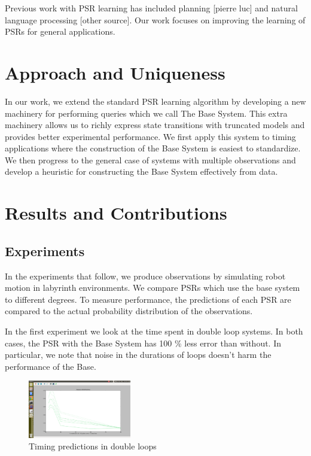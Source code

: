 \documentclass{acm_proc_article-sp}
\begin{document}
Previous work with PSR learning has included planning [pierre luc] and natural language processing [other source]. Our work focuses on improving the learning of PSRs for general applications.

\section{Approach and Uniqueness} 

In our work, we extend the standard PSR learning algorithm by developing a new machinery for performing queries which we call The Base System. This extra machinery allows us to  richly express state transitions with truncated models and provides better experimental performance. We first apply this system to timing applications where the construction of the Base System is easiest to standardize. We then progress to the general case of systems with multiple observations and develop a heuristic for constructing the Base System effectively from data.

\section{Results and Contributions}

\subsection{Experiments}
In the experiments that follow, we produce observations by simulating robot motion in labyrinth environments. We compare PSRs which use the base system to different degrees. To measure performance, the predictions of each PSR are compared to the actual probability distribution of the observations. 

In the first experiment we look at the time spent in double loop systems. In both cases, the PSR with the Base System has 100 \% less error than without. In particular, we note that noise in the durations of loops doesn't harm the performance of the Base.

\begin{figure}[ht!]
\centering
\includegraphics[width=45mm]{PaperScreenShots/PacMan10000.png}
\caption{Timing predictions in double loops \label{overflow}}
\end{figure}
\end{document}
